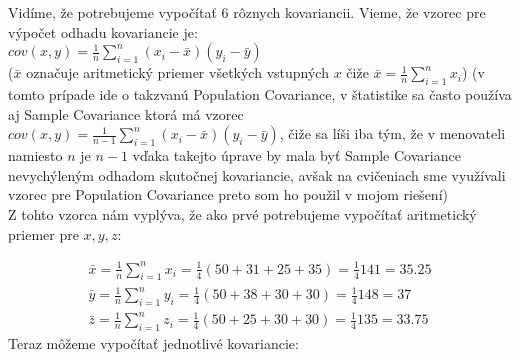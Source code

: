 \documentclass[a4paper]{article}
\begin{document}
	Vidíme, že potrebujeme vypočítať 6 rôznych kovariancii. Vieme, že vzorec pre výpočet odhadu kovariancie je:
	\\ 
	$cov(x,y)=\frac{1}{n}\sum_{i=1}^{n}(x_i-\bar{x})(y_i-\bar{y})$
	\\
	($\bar{x}$ označuje aritmetický priemer všetkých vstupných $x$ čiže $\bar{x}=\frac{1}{n}\sum_{i=1}^{n}x_i$) 
	(v tomto prípade ide o takzvanú Population Covariance, v štatistike sa často používa aj Sample Covariance ktorá má vzorec $cov(x,y)=\frac{1}{n-1}\sum_{i=1}^{n}(x_i-\bar{x})(y_i-\bar{y})$, čiže sa líši iba tým, že v menovateli namiesto $n$ je $n-1$ vďaka takejto úprave by mala byť Sample Covariance nevychýleným odhadom skutočnej kovariancie, avšak na cvičeniach sme využívali vzorec pre Population Covariance preto som ho použil v mojom riešení)
	\\
	Z tohto vzorca nám vyplýva, že ako prvé potrebujeme vypočítať aritmetický priemer pre $x, y, z$:
	
	\begin{align*}
		\bar{x}=\frac{1}{n}\sum_{i=1}^{n}x_i=\frac{1}{4}(50+31+25+35)=\frac{1}{4}141=35.25
		\\
		\bar{y}=\frac{1}{n}\sum_{i=1}^{n}y_i=\frac{1}{4}(50+38+30+30)=\frac{1}{4}148=37
		\\
		\bar{z}=\frac{1}{n}\sum_{i=1}^{n}z_i=\frac{1}{4}(50+25+30+30)=\frac{1}{4}135=33.75
	\end{align*}
	\newpage
	Teraz môžeme vypočítať jednotlivé kovariancie:
	
\end{document}
